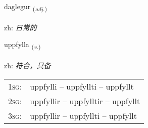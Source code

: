 \documentclass[frontgrid, backgrid]{flacards}\usepackage[]{graphicx}\usepackage[]{color}
\begin{document}
\renewcommand{\flhead}{\vskip5pt \fboxsep=0pt {\small\bfseries\footnotesize Lýsingarorð | 形容词}}
\renewcommand{\fcfoot}{\vskip5pt \fboxsep=0pt \hspace{2pt}{\small\bfseries\footnotesize 2K}}

\renewcommand{\blhead}{\vskip5pt {\small\bfseries\footnotesize Lýsingarorð | 形容词 }}
\renewcommand{\bcfoot}{\vskip5pt \hspace{2pt}{\small\bfseries\footnotesize 2K}}


{daglegur \small{\textsubscript{(\textit{adj.})}} \\[1ex] %
\textphonetic{[taɣlɛɣʏr]} \\
zh: \emph{日常的} \\  [2ex]
\renewcommand*{\arraystretch}{0.8}
}

\renewcommand{\flhead}{\vskip5pt \fboxsep=0pt {\small\bfseries\footnotesize Sagnorð | 动词}}
\renewcommand{\fcfoot}{\vskip5pt \fboxsep=0pt \hspace{2pt}{\small\bfseries\footnotesize 2K}}

\renewcommand{\blhead}{\vskip5pt {\small\bfseries\footnotesize Sagnorð | 动词 }}
\renewcommand{\bcfoot}{\vskip5pt \hspace{2pt}{\small\bfseries\footnotesize 2K}}


{uppfylla \small{\textsubscript{(\textit{v.})}} \\[1ex] %
\textphonetic{[ʏhpfɪtla]} \\
zh: \emph{符合，具备} \\  [2ex]
\renewcommand*{\arraystretch}{0.8}
\begin{tabular}{p{1cm}l}
\textsc{1sg}: & uppfylli -- uppfyllti -- uppfyllt \\ 
\textsc{2sg}: & uppfyllir -- uppfylltir -- uppfyllt \\ 
\textsc{3sg}: & uppfyllir -- uppfyllti -- uppfyllt \\ 
\end{tabular}
}
\end{document}
